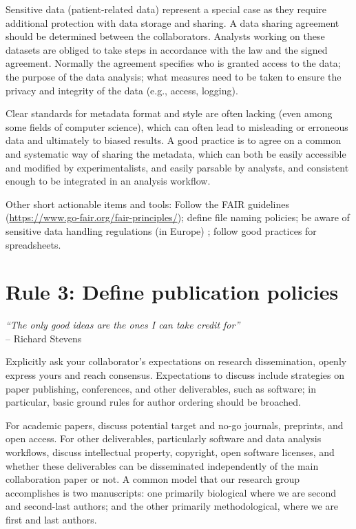 \documentclass{article}
\begin{document}
Sensitive data (patient-related data) represent a special case as they require additional protection with data storage and sharing.  A data sharing agreement should be determined between the collaborators. Analysts working on these datasets are obliged to take steps in accordance with the law and the signed agreement. Normally the agreement specifies who is granted access to the data; the purpose of the data analysis; what measures need to be taken to ensure the privacy and integrity of the data (e.g., access, logging). 

Clear standards for metadata format and style are often lacking (even among some fields of computer science), which can often lead to misleading or erroneous data and ultimately to biased results. A good practice is to agree on a common and systematic way of sharing the metadata, which can both be easily accessible and modified by experimentalists, and easily parsable by analysts, and consistent enough to be integrated in an analysis workflow.  

Other short actionable items and tools: Follow the FAIR guidelines (\url{https://www.go-fair.org/fair-principles/}); define file naming policies; be aware of sensitive data handling regulations (in Europe) \cite{shabani2019reidentifiability,party2011advice}; follow good practices for spreadsheets\cite{broman2018data}.

\section*{Rule 3: Define publication policies} %
\label{rule3_publication}

\begin{flushright}
\rightskip=1cm\textit{``The only good ideas are the ones I can take credit for''} \\
\vspace{.2em}
\rightskip=0cm -- Richard Stevens
\end{flushright}

Explicitly ask your collaborator's expectations on research dissemination, openly express yours and reach consensus. Expectations to discuss include strategies on paper publishing, conferences, and other deliverables, such as software; in particular, basic ground rules for author ordering should be broached.

For academic papers, discuss potential target and no-go journals, preprints, and open access. For other deliverables, particularly software and data analysis workflows, discuss intellectual property, copyright, open software licenses, and whether these deliverables can be disseminated independently of the main collaboration paper or not. A common model that our research group accomplishes is two manuscripts: one primarily biological where we are second and second-last authors; and the other primarily methodological, where we are first and last authors.
\end{document}
